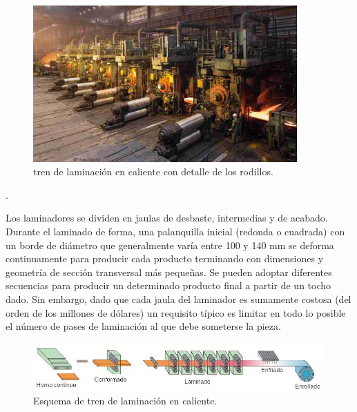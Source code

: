 \begin{figure}[h]
	\centering
	\includegraphics[width=0.90\textwidth]{./Figures/nlmk-lipetsk-dokoncovaci-stojany-na-valcovne-pasu-1793-r2.jpg}
	\caption{tren de laminación en caliente con detalle de los rodillos\protect\footnotemark.}
	\label{fig:hot-steel-rolling-mill}
\end{figure}.

Los laminadores se dividen en jaulas de desbaste, intermedias y de acabado. Durante el laminado de forma, una palanquilla inicial (redonda o cuadrada) con un borde de diámetro que generalmente varía entre 100 y 140 mm se deforma continuamente para producir cada producto terminando con dimensiones y geometría de sección transversal más pequeñas. Se pueden adoptar diferentes secuencias para producir un determinado producto final a partir de un tocho dado. Sin embargo, dado que cada jaula del laminador es sumamente costosa (del orden de los millones de dólares) un requisito típico es limitar en todo lo posible el número de pases de laminación al que debe someterse la pieza.


\begin{figure}[h]
	\centering
	\includegraphics[width=0.99\textwidth]{./Figures/EsquemaLaminadoCalienteFinal.jpg}
	\caption{Esquema de tren de laminación en caliente.}
	\label{fig:EsquemaLaminadoCaliente}
\end{figure}


